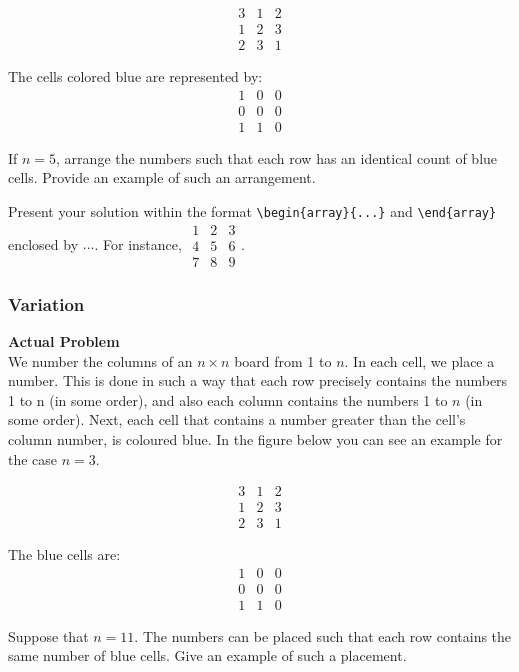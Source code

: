 $$\begin{array}{ccc}
3 & 1 & 2 \\
1 & 2 & 3 \\
2 & 3 & 1
\end{array}$$

The cells colored blue are represented by:
$$\begin{array}{ccc}
1 & 0 & 0 \\
0 & 0 & 0 \\
1 & 1 & 0
\end{array}$$

If $n = 5$, arrange the numbers such that each row has an identical count of blue cells. Provide an example of such an arrangement.

Present your solution within the format \verb|\begin{array}{...}| and \verb|\end{array}| enclosed by $\boxed{...}$. For instance, $\boxed{\begin{array}{ccc}1 & 2 & 3 \\ 4 & 5 & 6 \\ 7 & 8 & 9\end{array}}$.

\subsubsection{Variation}
\textbf{Actual Problem}\\
We number the columns of an $n \times n$ board from 1 to $n$. In each cell, we place a number. This is done in such a way that each row precisely contains the numbers 1 to n (in some order), and also each column contains the numbers 1 to $n$ (in some order). Next, each cell that contains a number greater than the cell’s column number, is coloured blue. In the figure below you can see an example for the case $n = 3$.

$$\begin{array}{ccc}
3 & 1 & 2 \\
1 & 2 & 3 \\
2 & 3 & 1
\end{array}$$

The blue cells are:
$$\begin{array}{ccc}
1 & 0 & 0 \\
0 & 0 & 0 \\
1 & 1 & 0
\end{array}$$

Suppose that $n = 11$. The numbers can be placed such that each row contains the same number of blue cells. Give an example of such a placement.

